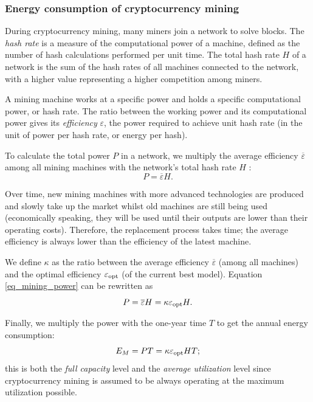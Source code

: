 \documentclass[12pt]{article}
\begin{document}
\subsubsection{Energy consumption of cryptocurrency mining}

During cryptocurrency mining, many miners join a network to solve blocks. The \textit{hash rate} is a measure of the computational power of a machine, defined as the number of hash calculations performed per unit time. The total hash rate $H$ of a network is the sum of the hash rates of all machines connected to the network, with a higher value representing a higher competition among miners.

A mining machine works at a specific power and holds a specific computational power, or hash rate. The ratio between the working power and its computational power gives its \textit{efficiency} $\varepsilon$, the power required to achieve unit hash rate (in the unit of power per hash rate, or energy per hash).

To calculate the total power $P$ in a network, we multiply the average efficiency $\overline{\varepsilon}$ among all mining machines with the network's total hash rate $H$ \citep{btc_energy}:
\begin{equation}
	P = \overline{\varepsilon} H.
	\label{eq_mining_power}
\end{equation}

Over time, new mining machines with more advanced technologies are produced and slowly take up the market whilst old machines are still being used (economically speaking, they will be used until their outputs are lower than their operating costs). Therefore, the replacement process takes time; the average efficiency is always lower than the efficiency of the latest machine.

We define $\kappa$ as the ratio between the average efficiency $\overline{\varepsilon}$ (among all machines) and the optimal efficiency $\varepsilon_{\rm opt}$ (of the current best model). Equation \ref{eq_mining_power} can be rewritten as
\begin{equation}
	P = \overline{\varepsilon} H = \kappa \varepsilon_{\rm opt} H.
\end{equation}

Finally, we multiply the power with the one-year time $T$ to get the annual energy consumption:
\begin{equation}
	E_M = PT = \kappa \varepsilon_{\rm opt} HT;
	\label{eq_crypto_energy}
\end{equation}
this is both the \textit{full capacity} level and the \textit{average utilization} level since cryptocurrency mining is assumed to be always operating at the maximum utilization possible.
\end{document}
